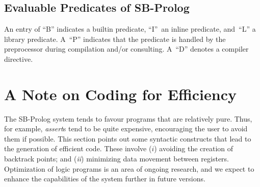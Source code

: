 

\appendix
\begin{thepredindex}{
\section{Evaluable Predicates of SB-Prolog}\label{builtins}
An entry of ``B'' indicates a builtin predicate, ``I''~an inline predicate,
and~``L'' a library predicate.
A~``P'' indicates that the predicate is
handled by the preprocessor during compilation and/or consulting.
A~``D'' denotes a compiler directive.}
\vspace{2ex}

\end{thepredindex}

\section{A Note on Coding for Efficiency} \label{coding_for_efficiency}
The SB-Prolog system tends to favour programs that are relatively pure.
Thus, for example, {\em assert}s tend to be quite expensive,
encouraging the user to avoid them if possible.
This section points out some syntactic constructs that lead to the generation
of efficient code.
These involve ($i$) avoiding the creation of backtrack points;
and ({\em ii}) minimizing data movement between registers.
Optimization of logic programs is an area of ongoing research,
and we expect to enhance the capabilities of the system further in future
versions.

